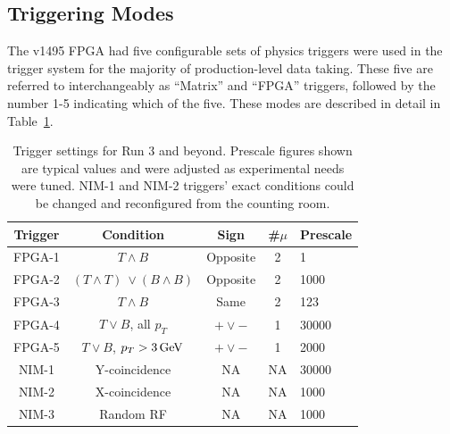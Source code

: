 \subsection{Triggering Modes}

The v1495 FPGA had five configurable sets of physics triggers were used in the trigger system for the majority of production-level data taking. These five are referred to interchangeably as ``Matrix'' and ``FPGA'' triggers, followed by the number 1-5 indicating which of the five. These modes are described in detail in Table~\ref{tab:trigger-settings}.

\begin{table}\centering
\begin{tabular}{c|cccl}
\hline
Trigger & Condition       & Sign    & \#$\mu$ & Prescale\\
\hline
FPGA-1   & $T \land B$                        & Opposite  & 2        & 1    \\
FPGA-2   & $(T \land T)\ \lor (B \land B)$  & Opposite  & 2        & 1000 \\
FPGA-3   & $T \land B$                        & Same        & 2        & 123  \\
FPGA-4   & $T \lor B$, all $p_T$            & $+ \lor -$& 1        & 30000\\
FPGA-5   & $T \lor B$, $p_T > \unit[3]{GeV}$            & $+ \lor -$& 1        & 2000 \\
NIM-1    & Y-coincidence                     & NA        & NA    & 30000\\
NIM-2    & X-coincidence                    & NA        & NA    & 1000 \\
NIM-3     & Random RF                        & NA        & NA    & 1000 \\
\hline
\end{tabular}
\caption{Trigger settings for Run 3 and beyond. Prescale figures shown are typical values and were adjusted as experimental needs were tuned. NIM-1 and NIM-2 triggers' exact conditions could be changed and reconfigured from the counting room.}
\label{tab:trigger-settings}
\end{table}

